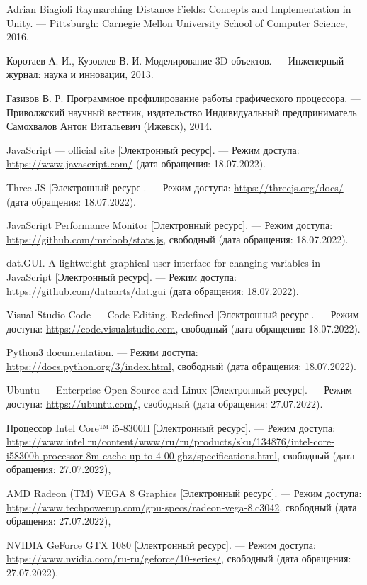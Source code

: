 \begin{thebibliography}{}
	Adrian Biagioli Raymarching Distance Fields: Concepts and Implementation in Unity. --- Pittsburgh: Carnegie Mellon University School of Computer Science, 2016.

	Коротаев А. И., Кузовлев В. И. Моделирование 3D объектов. --- Инженерный журнал: наука и инновации, 2013.

	Газизов В. Р. Программное профилирование работы графического процессора. --- Приволжский научный вестник, издательство Индивидуальный предприниматель Самохвалов Антон Витальевич (Ижевск), 2014.

	JavaScript --- official site [Электронный ресурс]. --- Режим доступа: \url{https://www.javascript.com/} (дата обращения: 18.07.2022).

	Three JS [Электронный ресурс]. --- Режим доступа: \url{https://threejs.org/docs/} (дата обращения: 18.07.2022).

	JavaScript Performance Monitor [Электронный ресурс]. --- Режим доступа: \url{https://github.com/mrdoob/stats.js}, свободный (дата обращения: 18.07.2022).

	dat.GUI. A lightweight graphical user interface for changing variables in JavaScript [Электронный ресурс]. --- Режим доступа: \url{https://github.com/dataarts/dat.gui} (дата обращения: 18.07.2022).

	Visual Studio Code --- Code Editing. Redefined [Электронный ресурс]. --- Режим доступа: \url{https://code.visualstudio.com}, свободный (дата обращения: 18.07.2022).

	Python3 documentation. --- Режим доступа: \url{https://docs.python.org/3/index.html}, свободный (дата обращения: 18.07.2022).

	Ubuntu --- Enterprise Open Source and Linux [Электронный
	ресурс]. --- Режим доступа: \url{https://ubuntu.com/}, свободный (дата обращения: 27.07.2022).

	Процессор Intel Core™ i5-8300H [Электронный ресурс]. --- Режим доступа: \url{https://www.intel.ru/content/www/ru/ru/products/sku/134876/intel-core-i58300h-processor-8m-cache-up-to-4-00-ghz/specifications.html}, свободный (дата обращения: 27.07.2022),

	AMD Radeon (TM) VEGA 8 Graphics [Электронный ресурс]. --- Режим доступа: \url{https://www.techpowerup.com/gpu-specs/radeon-vega-8.c3042}, свободный (дата обращения: 27.07.2022),

	NVIDIA GeForce GTX 1080 [Электронный ресурс]. --- Режим доступа: \url{https://www.nvidia.com/ru-ru/geforce/10-series/}, свободный (дата обращения: 27.07.2022).
\end{thebibliography}
\endgroup

\pagebreak